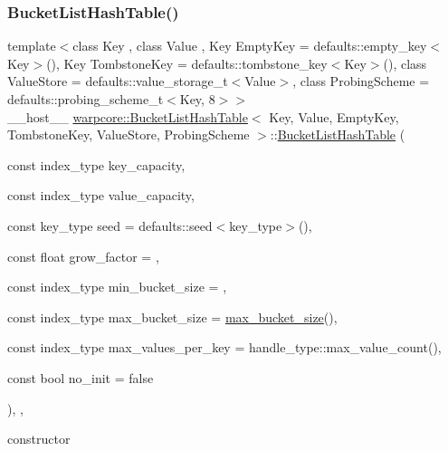 \subsubsection{\texorpdfstring{Bucket\+List\+Hash\+Table()}{BucketListHashTable()}\hspace{0.1cm}{\footnotesize\ttfamily [1/3]}}
{\footnotesize\ttfamily template$<$class Key , class Value , Key Empty\+Key = defaults\+::empty\+\_\+key$<$\+Key$>$(), Key Tombstone\+Key = defaults\+::tombstone\+\_\+key$<$\+Key$>$(), class Value\+Store  = defaults\+::value\+\_\+storage\+\_\+t$<$\+Value$>$, class Probing\+Scheme  = defaults\+::probing\+\_\+scheme\+\_\+t$<$\+Key, 8$>$$>$ \\
\+\_\+\+\_\+host\+\_\+\+\_\+ \hyperlink{classwarpcore_1_1BucketListHashTable}{warpcore\+::\+Bucket\+List\+Hash\+Table}$<$ Key, Value, Empty\+Key, Tombstone\+Key, Value\+Store, Probing\+Scheme $>$\+::\hyperlink{classwarpcore_1_1BucketListHashTable}{Bucket\+List\+Hash\+Table} (\begin{DoxyParamCaption}\item[{const index\+\_\+type}]{key\+\_\+capacity,  }\item[{const index\+\_\+type}]{value\+\_\+capacity,  }\item[{const key\+\_\+type}]{seed = {\ttfamily defaults\+:\+:seed$<$key\+\_\+type$>$()},  }\item[{const float}]{grow\+\_\+factor = {},  }\item[{const index\+\_\+type}]{min\+\_\+bucket\+\_\+size = {},  }\item[{const index\+\_\+type}]{max\+\_\+bucket\+\_\+size = {\ttfamily \hyperlink{classwarpcore_1_1BucketListHashTable_a3b9c182c25464b5d6fa87d32f80fe281}{max\+\_\+bucket\+\_\+size}()},  }\item[{const index\+\_\+type}]{max\+\_\+values\+\_\+per\+\_\+key = {\ttfamily handle\+\_\+type\+:\+:max\+\_\+value\+\_\+count()},  }\item[{const bool}]{no\+\_\+init = {\ttfamily false} }\end{DoxyParamCaption})\hspace{0.3cm}{\ttfamily [inline]}, {\ttfamily [explicit]}, {\ttfamily [noexcept]}}



constructor 


